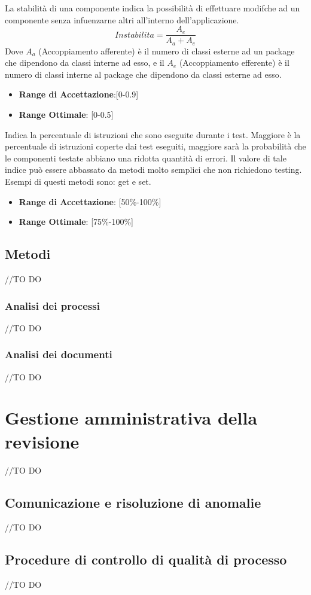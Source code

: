 \documentclass[12pt,a4paper]{article}
\begin{document}
La stabilità di una componente indica la possibilità di effettuare modifche ad un componente senza infuenzarne altri all’interno dell'applicazione.
\[Instabilita=\frac{A_e}{A_a+A_e}\]
Dove $A_a$ (Accoppiamento afferente) è il numero di classi esterne ad un package che dipendono da classi interne ad esso, e il $A_e$ (Accoppiamento efferente) è il numero di classi interne al package che dipendono da classi esterne ad esso.
\begin{itemize}
\item \textbf{Range di Accettazione}:[0-0.9]
\item \textbf{Range Ottimale}: [0-0.5]
\end{itemize}
Indica la percentuale di istruzioni che sono eseguite durante i test. Maggiore è la percentuale di istruzioni coperte dai test eseguiti, maggiore sarà la probabilità che le componenti testate abbiano una ridotta quantità di errori. Il valore di tale indice può essere abbassato da metodi molto semplici che non richiedono testing. Esempi di questi metodi sono: get e set.
\begin{itemize}
\item \textbf{Range di Accettazione}: [50\%-100\%]
\item \textbf{Range Ottimale}: [75\%-100\%]
\end{itemize}
\subsection{Metodi}
//TO DO \AVI
\subsubsection{Analisi dei processi}
//TO DO \AVI
\subsubsection{Analisi dei documenti}
//TO DO \AVI
\newpage
\section{Gestione amministrativa della revisione}
//TO DO \AVI
\subsection{Comunicazione e risoluzione di anomalie}
//TO DO \AVI 
\subsection{Procedure di controllo di qualità di processo}
//TO DO \IB
\end{document}
